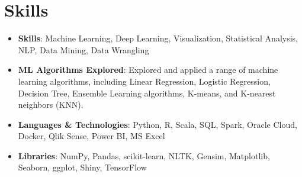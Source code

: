 \documentclass[letterpaper,11pt]{article}
\newcommand{\resumeSubHeadingListStart}{\begin{itemize}[leftmargin=*]}
\newcommand{\resumeSubHeadingListEnd}{\end{itemize}}
\begin{document}
\section{Skills}
\resumeSubHeadingListStart
\item{
            \textbf{Skills}{: Machine Learning, Deep Learning, Visualization, Statistical Analysis, NLP, Data Mining, Data Wrangling}
      }
\item {
            \textbf{ML Algorithms Explored}{: Explored and applied a range of machine learning algorithms, including Linear Regression, Logistic Regression, Decision Tree, Ensemble Learning algorithms, K-means, and K-nearest neighbors (KNN).}
      }
\item {
            \textbf{Languages \& Technologies}{: Python, R, Scala, SQL, Spark, Oracle Cloud, Docker, Qlik Sense, Power BI, MS Excel}
      }
\item {
            \textbf{Libraries}{: NumPy, Pandas, scikit-learn, NLTK, Gensim, Matplotlib, Seaborn, ggplot, Shiny,  TensorFlow}
      }
\resumeSubHeadingListEnd


\end{document}
